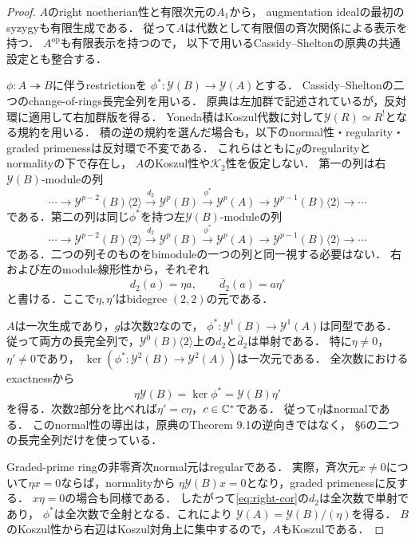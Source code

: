 \documentclass[11pt,a4paper]{ltjsarticle}
\begin{document}
\begin{proof}
$A$のright noetherian性と有限次元の$A_1$から，
augmentation idealの最初のsyzygyも有限生成である．
従って$A$は代数として有限個の斉次関係による表示を持つ．
$A^{\mathrm{op}}$も有限表示を持つので，
以下で用いるCassidy--Sheltonの原典の共通設定とも整合する．

$\phi:A\twoheadrightarrow B$に伴うrestrictionを
$\phi^*:\mathcal Y(B)\to\mathcal Y(A)$とする．
Cassidy--Shelton\cite[\S6, (6.1), (6.2)]{CassidyShelton}の二つのchange-of-rings長完全列を用いる．
原典は左加群で記述されているが，反対環に適用して右加群版を得る．
Yoneda積はKoszul代数に対して$\mathcal Y(R)\simeq R^!$となる規約を用いる．
積の逆の規約を選んだ場合も，以下のnormal性・regularity・graded primenessは反対環で不変である．
これらはともに$g$のregularityとnormalityの下で存在し，
$A$のKoszul性や$\mathcal K_2$性を仮定しない．
第一の列は右$\mathcal Y(B)$-moduleの列
\begin{equation}
\label{eq:right-cor}
 \cdots\longrightarrow
 \mathcal Y^{p-2}(B)\langle2\rangle
 \xrightarrow{d_2}\mathcal Y^p(B)
 \xrightarrow{\phi^*}\mathcal Y^p(A)
 \longrightarrow\mathcal Y^{p-1}(B)\langle2\rangle
 \longrightarrow\cdots
\end{equation}
である．第二の列は同じ$\phi^*$を持つ左$\mathcal Y(B)$-moduleの列
\begin{equation}
\label{eq:left-cor}
 \cdots\longrightarrow
 \mathcal Y^{p-2}(B)\langle2\rangle
 \xrightarrow{\bar d_2}\mathcal Y^p(B)
 \xrightarrow{\phi^*}\mathcal Y^p(A)
 \longrightarrow\mathcal Y^{p-1}(B)\langle2\rangle
 \longrightarrow\cdots
\end{equation}
である．二つの列そのものをbimoduleの一つの列と同一視する必要はない．
右および左のmodule線形性から，それぞれ
\[
 d_2(a)=\eta a,\qquad \bar d_2(a)=a\eta'
\]
と書ける．ここで$\eta,\eta'$はbidegree $(2,2)$の元である．

$A$は一次生成であり，$g$は次数2なので，
$\phi^*:\mathcal Y^1(B)\to\mathcal Y^1(A)$は同型である．
従って両方の長完全列で，$\mathcal Y^0(B)\langle2\rangle$上の$d_2$と$\bar d_2$は単射である．
特に$\eta\ne0$，$\eta'\ne0$であり，
$\ker(\phi^*:\mathcal Y^2(B)\to\mathcal Y^2(A))$は一次元である．
全次数におけるexactnessから
\[
 \eta\mathcal Y(B)=\ker\phi^*=\mathcal Y(B)\eta'
\]
を得る．次数2部分を比べれば$\eta'=c\eta$，$c\in\mathbb C^*$である．
従って$\eta$はnormalである．
このnormal性の導出は，原典のTheorem 9.1の逆向きではなく，
\S6の二つの長完全列だけを使っている．

Graded-prime ringの非零斉次normal元はregularである．
実際，斉次元$x\ne0$について$\eta x=0$ならば，normalityから
$\eta\mathcal Y(B)x=0$となり，graded primenessに反する．
$x\eta=0$の場合も同様である．
したがって\eqref{eq:right-cor}の$d_2$は全次数で単射であり，
$\phi^*$は全次数で全射となる．これにより
$\mathcal Y(A)=\mathcal Y(B)/(\eta)$を得る．
$B$のKoszul性から右辺はKoszul対角上に集中するので，$A$もKoszulである．
\end{proof}
\end{document}
